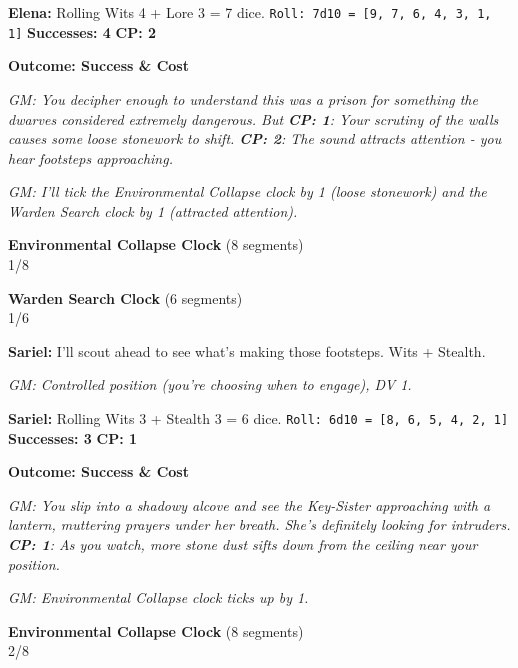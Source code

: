 \documentclass[11pt]{article}
\newcommand{\player}[1]{\textbf{#1:}}
\newcommand{\gm}[1]{\textit{GM: #1}}
\newcommand{\roll}[2]{\texttt{Roll: #1d10 = [#2]}}
\newcommand{\success}[1]{\textbf{Successes: #1}}
\newcommand{\cp}[1]{\textbf{CP: #1}}
\newcommand{\outcome}[1]{\textbf{Outcome: #1}}
\newcommand{\clocksegment}{\textbullet}
\begin{document}
\player{Elena} Rolling Wits 4 + Lore 3 = 7 dice. \roll{7}{9, 7, 6, 4, 3, 1, 1} \success{4} \cp{2}

\outcome{Success \& Cost}

\gm{You decipher enough to understand this was a prison for something the dwarves considered extremely dangerous. But \cp{1}: Your scrutiny of the walls causes some loose stonework to shift. \cp{2}: The sound attracts attention - you hear footsteps approaching.}

\gm{I'll tick the Environmental Collapse clock by 1 (loose stonework) and the Warden Search clock by 1 (attracted attention).}

\begin{center}
\textbf{Environmental Collapse Clock} (8 segments)\\
\fbox{\textcolor{clockcolor}{\clocksegment}\clocksegment\clocksegment\clocksegment\clocksegment\clocksegment\clocksegment\clocksegment} 1/8
\end{center}

\begin{center}
\textbf{Warden Search Clock} (6 segments)\\
\fbox{\textcolor{clockcolor}{\clocksegment}\clocksegment\clocksegment\clocksegment\clocksegment\clocksegment} 1/6
\end{center}

\player{Sariel} I'll scout ahead to see what's making those footsteps. Wits + Stealth.

\gm{Controlled position (you're choosing when to engage), DV 1.}

\player{Sariel} Rolling Wits 3 + Stealth 3 = 6 dice. \roll{6}{8, 6, 5, 4, 2, 1} \success{3} \cp{1}

\outcome{Success \& Cost}

\gm{You slip into a shadowy alcove and see the Key-Sister approaching with a lantern, muttering prayers under her breath. She's definitely looking for intruders. \cp{1}: As you watch, more stone dust sifts down from the ceiling near your position.}

\gm{Environmental Collapse clock ticks up by 1.}

\begin{center}
\textbf{Environmental Collapse Clock} (8 segments)\\
\fbox{\textcolor{clockcolor}{\clocksegment\clocksegment}\clocksegment\clocksegment\clocksegment\clocksegment\clocksegment\clocksegment} 2/8
\end{center}
\end{document}
